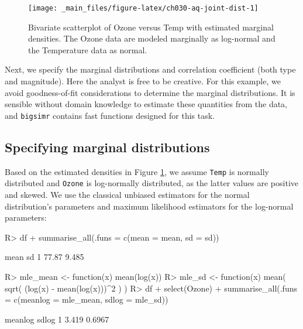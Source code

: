 \documentclass[
]{jss}
\begin{document}
\begin{CodeChunk}
\begin{figure}

{\centering \texttt{[image: \_main\_files/figure-latex/ch030-aq-joint-dist-1]} 

}

\caption[Bivariate scatterplot of Ozone versus Temp with estimated marginal densities]{Bivariate scatterplot of Ozone versus Temp with estimated marginal densities. The Ozone data are modeled marginally as log-normal and the Temperature data as normal.}\label{fig:ch030-aq-joint-dist}
\end{figure}
\end{CodeChunk}

Next, we specify the marginal distributions and correlation coefficient (both type and magnitude). Here the analyst is free to be creative. For this example, we avoid goodness-of-fit considerations to determine the marginal distributions. It is sensible without domain knowledge to estimate these quantities from the data, and \texttt{bigsimr} contains fast functions designed for this task.

\hypertarget{specifying-marginal-distributions}{%
\subsection{Specifying marginal distributions}\label{specifying-marginal-distributions}}

Based on the estimated densities in Figure \ref{fig:ch030-aq-joint-dist}, we assume \texttt{Temp} is normally distributed and \texttt{Ozone} is log-normally distributed, as the latter values are positive and skewed. We use the classical unbiased estimators for the normal distribution's parameters and maximum likelihood estimators for the log-normal parameters:

\begin{CodeChunk}
\begin{CodeInput}
R> df %
+   summarise_all(.funs = c(mean = mean, sd = sd))
\end{CodeInput}
\begin{CodeOutput}
   mean    sd
1 77.87 9.485
\end{CodeOutput}
\end{CodeChunk}

\begin{CodeChunk}
\begin{CodeInput}
R> mle_mean <- function(x) mean(log(x))
R> mle_sd <- function(x) mean( sqrt( (log(x) - mean(log(x)))^2 ) )
R> df %
+   select(Ozone) %
+   summarise_all(.funs = c(meanlog = mle_mean, sdlog = mle_sd))
\end{CodeInput}
\begin{CodeOutput}
  meanlog  sdlog
1   3.419 0.6967
\end{CodeOutput}
\end{CodeChunk}
\end{document}
